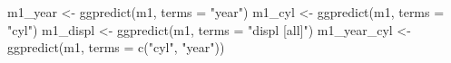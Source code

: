 \documentclass[
  11pt,
  a4paper,
  twoside]{scrbook}
\newenvironment{Shaded}{\begin{snugshade}}{\end{snugshade}}
\newcommand{\AttributeTok}[1]{\textcolor[rgb]{0.77,0.63,0.00}{#1}}
\newcommand{\FunctionTok}[1]{\textcolor[rgb]{0.00,0.00,0.00}{#1}}
\newcommand{\NormalTok}[1]{#1}
\newcommand{\OtherTok}[1]{\textcolor[rgb]{0.56,0.35,0.01}{#1}}
\newcommand{\StringTok}[1]{\textcolor[rgb]{0.31,0.60,0.02}{#1}}
\begin{document}
\newpage

\linespread{1}

\begin{Shaded}
\begin{Highlighting}[]
\NormalTok{m1\_year }\OtherTok{\textless{}{-}} \FunctionTok{ggpredict}\NormalTok{(m1, }\AttributeTok{terms =} \StringTok{"year"}\NormalTok{)}
\NormalTok{m1\_cyl }\OtherTok{\textless{}{-}} \FunctionTok{ggpredict}\NormalTok{(m1, }\AttributeTok{terms =} \StringTok{"cyl"}\NormalTok{)}
\NormalTok{m1\_displ }\OtherTok{\textless{}{-}} \FunctionTok{ggpredict}\NormalTok{(m1, }\AttributeTok{terms =} \StringTok{"displ [all]"}\NormalTok{)}
\NormalTok{m1\_year\_cyl }\OtherTok{\textless{}{-}} \FunctionTok{ggpredict}\NormalTok{(m1, }\AttributeTok{terms =} \FunctionTok{c}\NormalTok{(}\StringTok{"cyl"}\NormalTok{, }\StringTok{"year"}\NormalTok{))}


\end{Highlighting}
\end{Shaded}
\end{document}
